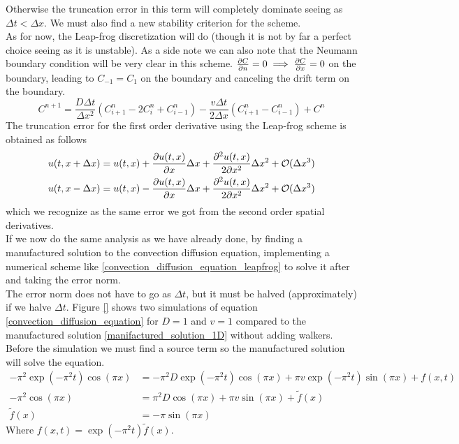 Otherwise the truncation error in this term will completely dominate seeing as $\Delta t<\Delta x$. 
We must also find a new stability criterion for the scheme. \\
As for now, the Leap-frog discretization will do (though it is not by far a perfect choice seeing as it is unstable). 
As a side note we can also note that the Neumann boundary condition will be very clear in this scheme. 
$\frac{\partial C}{\partial n} = 0 \implies \frac{\partial C}{\partial x} = 0 $ on the boundary, leading to $C_{-1} = C_{1}$ on the boundary and canceling the drift term on the boundary.
\begin{equation}\label{convection_diffusion_equation_leapfrog}
 C^{n+1} = \frac{D\Delta t}{\Delta x^2}\left(C^n_{i+1}-2C^n_i+C^n_{i-1}\right)-\frac{v\Delta t}{2\Delta x}\left(C^n_{i+1}-C^n_{i-1}\right) + C^n
\end{equation}
The truncation error for the first order derivative using the Leap-frog scheme is obtained as follows
\begin{align*}
 u(t,x+\Delta x) = u(t,x) + \frac{\partial u(t,x)}{\partial x}\Delta x + \frac{\partial^2u(t,x)}{2\partial x^2}\Delta x^2 +\mathcal{O}(\Delta x^3)\\
 u(t,x-\Delta x) = u(t,x) - \frac{\partial u(t,x)}{\partial x}\Delta x + \frac{\partial^2u(t,x)}{2\partial x^2}\Delta x^2 +\mathcal{O}(\Delta x^3)
\end{align*}
which we recognize as the same error we got from the second order spatial derivatives.\\
If we now do the same analysis as we have already done, by finding a manufactured solution to the convection diffusion equation, implementing a numerical scheme like \ref{convection_diffusion_equation_leapfrog} to solve it after and taking the error norm. \\
The error norm does not have to go as $\Delta t$, but it must be halved (approximately) if we halve $\Delta t$. 
Figure \ref{} shows two simulations of equation \ref{convection_diffusion_equation} for $D =1$ and $v=1$ compared to the manufactured solution \ref{manifactured_solution_1D} without adding walkers. 
Before the simulation we must find a source term so the manufactured solution will solve the equation.
\begin{align*}
 -\pi^2\exp\left(-\pi^2t\right)\cos\left(\pi x\right) &= -\pi^2D\exp\left(-\pi^2t\right)\cos\left(\pi x\right) + \pi v \exp\left(-\pi^2t\right)\sin\left(\pi x\right) + f(x,t)\\
 -\pi^2\cos\left(\pi x\right) &= \pi^2D\cos\left(\pi x\right) +\pi v \sin\left(\pi x\right) + \tilde{f}(x) \\
 \tilde{f}(x) &= -\pi\sin\left(\pi x\right)
\end{align*}
Where $f(x,t) = \exp\left(-\pi^2t\right)\tilde{f}(x)$.

